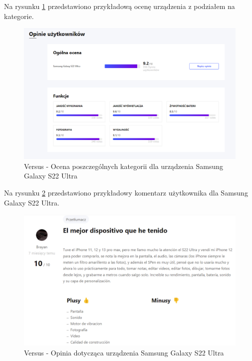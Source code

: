 Na rysunku \ref*{versus_3} przedstawiono przykładową ocenę urządzenia z podziałem na kategorie.
\begin{figure}[H]
    \centering
    \includegraphics[scale=0.45]{img/versus/versusOpinie.png}
    \caption{Versus - Ocena poszczególnych kategorii dla urządzenia Samsung Galaxy S22 Ultra}
    \label{versus_3}
\end{figure}
Na rysunku \ref*{versus_4} przedstawiono przykładowy komentarz użytkownika dla Samsung Galaxy S22 Ultra.
\begin{figure}[H]
    \centering
    \includegraphics[scale=0.45]{img/versus/versusKomentarze.png}
    \caption{Versus - Opinia dotycząca urządzenia Samsung Galaxy S22 Ultra}
    \label{versus_4}
\end{figure}

